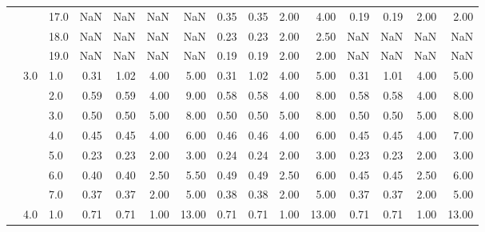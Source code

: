 \begin{tabular}{lllrrrrrrrrrrrr}
      &     & 17.0 &        NaN &       NaN &  NaN &    NaN &       0.35 &      0.35 & 2.00 &   4.00 &       0.19 &      0.19 & 2.00 &   2.00 \\
      &     & 18.0 &        NaN &       NaN &  NaN &    NaN &       0.23 &      0.23 & 2.00 &   2.50 &        NaN &       NaN &  NaN &    NaN \\
      &     & 19.0 &        NaN &       NaN &  NaN &    NaN &       0.19 &      0.19 & 2.00 &   2.00 &        NaN &       NaN &  NaN &    NaN \\
      & 3.0 & 1.0  &       0.31 &      1.02 & 4.00 &   5.00 &       0.31 &      1.02 & 4.00 &   5.00 &       0.31 &      1.01 & 4.00 &   5.00 \\
      &     & 2.0  &       0.59 &      0.59 & 4.00 &   9.00 &       0.58 &      0.58 & 4.00 &   8.00 &       0.58 &      0.58 & 4.00 &   8.00 \\
      &     & 3.0  &       0.50 &      0.50 & 5.00 &   8.00 &       0.50 &      0.50 & 5.00 &   8.00 &       0.50 &      0.50 & 5.00 &   8.00 \\
      &     & 4.0  &       0.45 &      0.45 & 4.00 &   6.00 &       0.46 &      0.46 & 4.00 &   6.00 &       0.45 &      0.45 & 4.00 &   7.00 \\
      &     & 5.0  &       0.23 &      0.23 & 2.00 &   3.00 &       0.24 &      0.24 & 2.00 &   3.00 &       0.23 &      0.23 & 2.00 &   3.00 \\
      &     & 6.0  &       0.40 &      0.40 & 2.50 &   5.50 &       0.49 &      0.49 & 2.50 &   6.00 &       0.45 &      0.45 & 2.50 &   6.00 \\
      &     & 7.0  &       0.37 &      0.37 & 2.00 &   5.00 &       0.38 &      0.38 & 2.00 &   5.00 &       0.37 &      0.37 & 2.00 &   5.00 \\
      & 4.0 & 1.0  &       0.71 &      0.71 & 1.00 &  13.00 &       0.71 &      0.71 & 1.00 &  13.00 &       0.71 &      0.71 & 1.00 &  13.00 \\
\bottomrule
\end{tabular}
